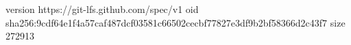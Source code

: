 version https://git-lfs.github.com/spec/v1
oid sha256:9cdf64e1f4a57caf487dcf03581c66502cecbf77827e3df9b2bf58366d2c43f7
size 272913
